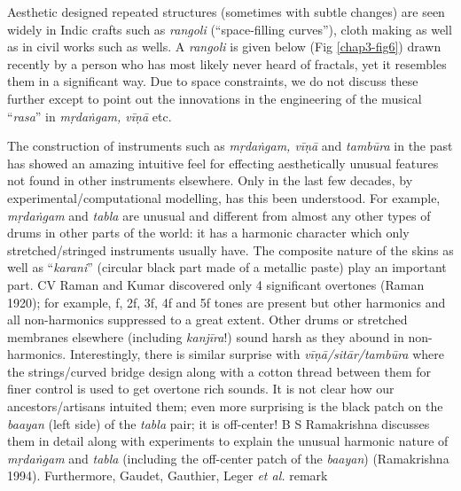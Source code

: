 Aesthetic designed repeated structures (sometimes with subtle changes) are seen widely in Indic crafts such as \textsl{rangoli} (“space-filling curves”), cloth making as well as in civil works such as wells. A \textsl{rangoli} is given below (Fig \ref{chap3-fig6}) drawn recently by a person who has most likely never heard of fractals, yet it resembles them in a significant way. Due to space constraints, we do not discuss these further except to point out the innovations in the engineering of the musical “\textsl{rasa}” in \textsl{mṛdaṅgam, vīṇā} etc.

The construction of instruments such as \textsl{mṛdaṅgam, vīṇā} and \textsl{tambūra} in the past has showed an amazing intuitive feel for effecting aesthetically unusual features not found in other instruments elsewhere. Only in the last few decades, by experimental/computational modelling, has this been understood. For example, \textsl{mṛdaṅgam} and \textsl{tabla} are unusual and different from almost any other types of drums in other parts of the world: it has a harmonic character which only stretched/\-stringed instruments usually have. The composite nature of the skins as well as “\textsl{karani}” (circular black part made of a metallic paste) play an important part.  CV Raman and Kumar discovered only 4 significant overtones (Raman 1920); for example, f, 2f, 3f, 4f and 5f tones are present but other harmonics and all non-harmonics suppressed to a great extent. Other drums or stretched membranes elsewhere (including \textsl{kanjīra}!) sound harsh as they abound in non-harmonics. Interestingly, there is similar surprise with \textsl{vīṇā/sitār/tambūra} where the strings/curved bridge design along with a cotton thread between them for finer control is used to get overtone rich sounds. It is not clear how our ancestors/artisans intuited them; even more surprising is the black patch on the \textsl{baayan} (left side) of the \textsl{tabla} pair; it is off-center! B S Ramakrishna discusses them in detail along with experiments to explain the unusual harmonic nature of \textsl{mṛdaṅgam} and \textsl{tabla} (including the off-center patch of the \textsl{baayan}) (Ramakrishna 1994). Furthermore, Gaudet, Gauthier, Leger \textsl{et al.} remark 

